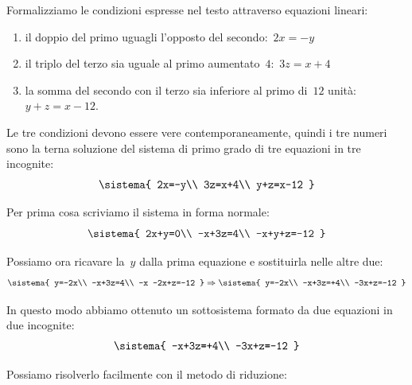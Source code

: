 \begin{soluzione}
Formalizziamo le condizioni espresse nel testo attraverso equazioni
lineari:

\begin{enumerate}[nosep]
\item il doppio del primo uguagli l'opposto del secondo:~\(2x=-y\)
\item il triplo del terzo sia uguale al primo aumentato~\(4\):~\(3z=x+4\)
\item la somma del secondo con il terzo sia inferiore al primo di~\(12\) 
unità:~\(y+z=x-12\).
\end{enumerate}

Le tre condizioni devono essere vere contemporaneamente, quindi i tre
numeri sono la terna soluzione del sistema di primo grado di tre 
equazioni in tre incognite:\\[-.5em]
\[\sistema{
  2x=-y\\
  3z=x+4\\
  y+z=x-12
}\]

Per prima cosa scriviamo il sistema in forma normale:\\[-.5em]
\[\sistema{
  2x+y=0\\
  -x+3z=4\\
  -x+y+z=-12
}\]

Possiamo ora ricavare la~\(y\) dalla prima equazione e sostituirla nelle 
altre due:\\[-.5em]
\[\sistema{
  y=-2x\\
  -x+3z=4\\
  -x -2x+z=-12
}
\Rightarrow
\sistema{
  y=-2x\\
  -x+3z=+4\\
  -3x+z=-12
}\]

In questo modo abbiamo ottenuto un sottosistema formato da due equazioni 
in due incognite:\\[-.5em]
\[\sistema{
  -x+3z=+4\\
  -3x+z=-12
}\]

Possiamo risolverlo facilmente con il metodo di riduzione:\\[-.5em]



\end{soluzione}
